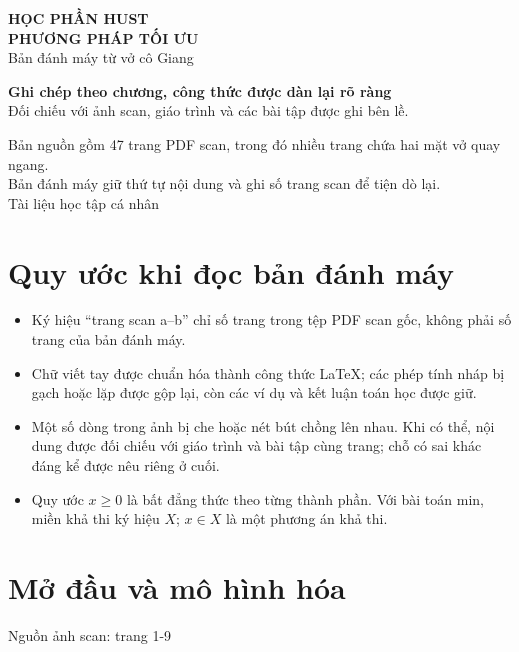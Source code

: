 \documentclass[11pt,a4paper]{article}
\newcommand{\src}[1]{\hfill{\footnotesize\color{gray}Nguồn ảnh scan: trang #1}}
\begin{document}
\begin{titlepage}
\centering
\vspace*{2.2cm}
{\Large\color{teal}\textbf{HỌC PHẦN HUST}}\\[1cm]
{\Huge\color{navy}\textbf{PHƯƠNG PHÁP TỐI ƯU}}\\[0.5cm]
{\LARGE Bản đánh máy từ vở cô Giang}\\[1.1cm]
\begin{tcolorbox}[width=.83\textwidth,colback=pale,colframe=navy,arc=2mm]
\centering
\textbf{Ghi chép theo chương, công thức được dàn lại rõ ràng}\\
Đối chiếu với ảnh scan, giáo trình và các bài tập được ghi bên lề.
\end{tcolorbox}
\vfill
{\large Bản nguồn gồm 47 trang PDF scan, trong đó nhiều trang chứa hai mặt vở quay ngang.}\\[4pt]
{\large Bản đánh máy giữ thứ tự nội dung và ghi số trang scan để tiện dò lại.}\\[1cm]
{\small Tài liệu học tập cá nhân}
\end{titlepage}

\tableofcontents
\clearpage

\section*{Quy ước khi đọc bản đánh máy}
\begin{itemize}
\item Ký hiệu ``trang scan a--b'' chỉ số trang trong tệp PDF scan gốc, không phải số trang của bản đánh máy.
\item Chữ viết tay được chuẩn hóa thành công thức LaTeX; các phép tính nháp bị gạch hoặc lặp được gộp lại, còn các ví dụ và kết luận toán học được giữ.
\item Một số dòng trong ảnh bị che hoặc nét bút chồng lên nhau. Khi có thể, nội dung được đối chiếu với giáo trình và bài tập cùng trang; chỗ có sai khác đáng kể được nêu riêng ở cuối.
\item Quy ước \(x\ge0\) là bất đẳng thức theo từng thành phần. Với bài toán min, miền khả thi ký hiệu \(X\); \(x\in X\) là một phương án khả thi.
\end{itemize}

\section{Mở đầu và mô hình hóa}
\src{1-9}
\end{document}
